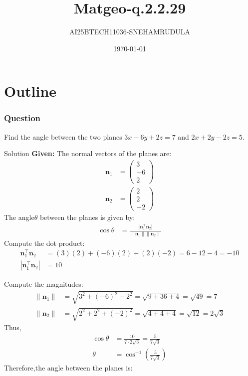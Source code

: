 \documentclass{beamer}
\title{Matgeo-q.2.2.29}
\author{AI25BTECH11036-SNEHAMRUDULA}
\date{\today}
\theoremstyle{remark}
\newcommand{\myvec}[1]{\ensuremath{\begin{pmatrix}#1\end{pmatrix}}}
\let\vec\mathbf
\begin{document}
\begin{frame}
\titlepage
\end{frame}

\section*{Outline}


\begin{frame}
\frametitle{Question}
 Find the angle between the two planes $3x - 6y + 2z = 7$ and $2x + 2y - 2z = 5$.

\end{frame}
%
\begin{frame}[t]{Solution}
\small
\textbf{Given:}\;
 The normal vectors of the planes are: \begin{align} \vec{n}_1 &= \myvec{3 \\ -6 \\ 2} \\ \vec{n}_2 &= \myvec{2 \\ 2 \\ -2} \end{align} The angle$\theta$ between the planes is given by: \begin{align} \cos \theta &= \frac{|\vec{n}_1^\top \vec{n}_2|}{\|\vec{n}_1\| \|\vec{n}_2\|} \end{align} Compute the dot product: \begin{align} \vec{n}_1^\top \vec{n}_2 &= (3)(2) + (-6)(2) + (2)(-2) = 6 - 12 - 4 = -10 \\ |\vec{n}_1^\top \vec{n}_2| &= 10 \end{align}
\end{frame}
 \begin{frame}
 Compute the magnitudes: \begin{align} \|\vec{n}_1\| &= \sqrt{3^2 + (-6)^2 + 2^2} = \sqrt{9 + 36 + 4} = \sqrt{49} = 7 \\ \|\vec{n}_2\| &= \sqrt{2^2 + 2^2 + (-2)^2} = \sqrt{4 + 4 + 4} = \sqrt{12} = 2\sqrt{3} \end{align} Thus, \begin{align} \cos \theta &= \frac{10}{7 \cdot 2\sqrt{3}} = \frac{5}{7\sqrt{3}} \\ \theta &= \cos^{-1} \left( \frac{5}{7\sqrt{3}} \right) \end{align} Therefore,the angle between the planes is:

\end{frame}
\end{document}

